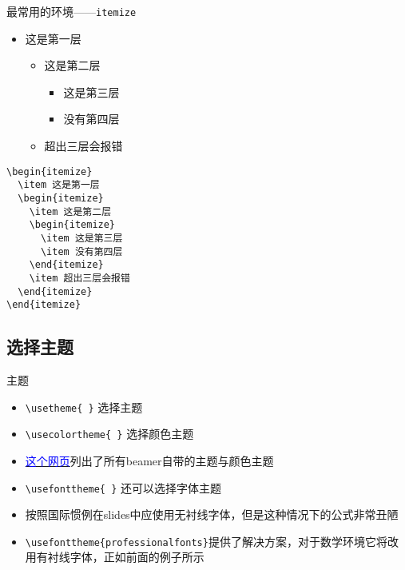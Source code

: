 \begin{frame}[fragile]{最常用的环境——\texttt{itemize}}
	\begin{itemize}
		\item 这是第一层
		\begin{itemize}
			\item 这是第二层
			\begin{itemize}
				\item 这是第三层
				\item 没有第四层
			\end{itemize}
			\item 超出三层会报错
		\end{itemize}
	\end{itemize}
	\small
\begin{lstlisting}
\begin{itemize}
  \item 这是第一层
  \begin{itemize}
    \item 这是第二层
    \begin{itemize}
      \item 这是第三层
      \item 没有第四层
    \end{itemize}
    \item 超出三层会报错
  \end{itemize}
\end{itemize}
\end{lstlisting}
\end{frame}
\subsection{选择主题}
\begin{frame}[fragile]{主题}
	\begin{itemize}
		\item \verb|\usetheme{ }| 选择主题
		\item \verb|\usecolortheme{ }| 选择颜色主题
		\item \href{https://hartwork.org/beamer-theme-matrix/}{\textcolor{blue}{这个网页}}列出了所有beamer自带的主题与颜色主题
		\item \verb|\usefonttheme{ }| 还可以选择字体主题
		\item 按照国际惯例在slides中应使用无衬线字体，但是这种情况下的公式非常丑陋
		\item \verb|\usefonttheme{professionalfonts}|提供了解决方案，对于数学环境它将改用有衬线字体，正如前面的例子所示
	\end{itemize}
\end{frame}
